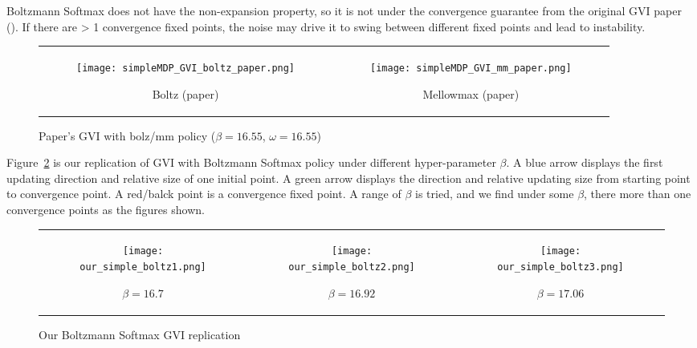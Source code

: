 Boltzmann Softmax does not have the non-expansion property, 
so it is not under the convergence guarantee from the original GVI paper (\cite{littman1996generalized}). 
If there are > 1 convergence fixed points, the noise may drive it to swing 
between different fixed points and lead to instability.

{\centering
\begin{figure}[H]
\begin{tabular}{cc}
\begin{subfigure}{0.45\textwidth}\centering\texttt{[image: simpleMDP\_GVI\_boltz\_paper.png]}\caption{Boltz (paper)}\end{subfigure}&
\begin{subfigure}{0.45\textwidth}\centering\texttt{[image: simpleMDP\_GVI\_mm\_paper.png]}\caption{Mellowmax (paper)}\end{subfigure}\\
\end{tabular}
\caption{Paper's GVI with bolz/mm policy ($\beta=16.55$, $\omega=16.55$)}\label{fig:simple_mdp_gvi_paper}
\end{figure}}


Figure\ \ref{fig:simple_mdp_gvi_our_bolz} is our replication of GVI with Boltzmann Softmax policy under different hyper-parameter $\beta$.
A blue arrow displays the first updating direction and relative size  of one initial point.
A green arrow displays the direction and relative updating size from starting point to convergence point.
A red/balck point is a convergence fixed point.
A range of $\beta$ is tried, and we find under some $\beta$, there more than one convergence points as the figures shown.

{\centering
\begin{figure}[H]
\begin{tabular}{ccc}
\begin{subfigure}{0.33\textwidth}\centering\texttt{[image: our\_simple\_boltz1.png]}\caption{$\beta=16.7$}\end{subfigure}&
\begin{subfigure}{0.33\textwidth}\centering\texttt{[image: our\_simple\_boltz2.png]}\caption{$\beta=16.92$}\end{subfigure}&
\begin{subfigure}{0.33\textwidth}\centering\texttt{[image: our\_simple\_boltz3.png]}\caption{$\beta=17.06$}\end{subfigure}\\
\end{tabular}
\caption{Our Boltzmann Softmax GVI replication}\label{fig:simple_mdp_gvi_our_bolz}
\end{figure}}

